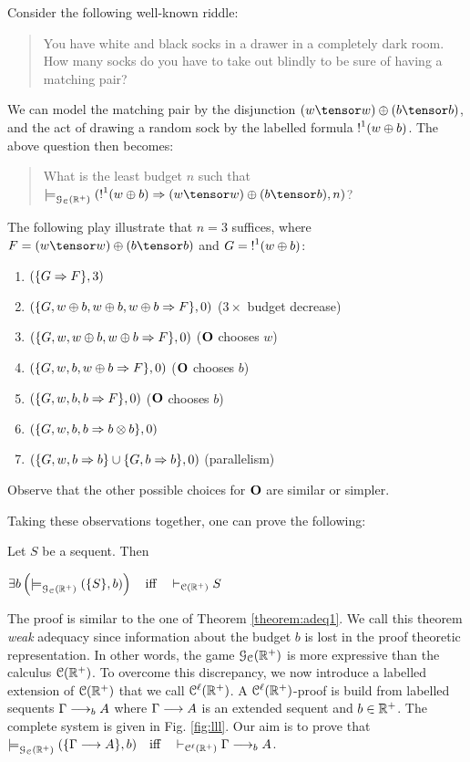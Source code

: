 \begin{example}\label{ex:riddle}
Consider the following well-known riddle:
\begin{quote}
You have white and black socks in a drawer in a completely dark room. How many socks do you have to take out blindly to be sure of having a matching pair? 
\end{quote}
We can model the matching pair by the disjunction $(w\tensor w)\oplus(b\tensor b)$, and the act of drawing a random sock by the labelled formula $\hbox{$\mathop{!}^{1}$}(w\oplus b)$. The above question then becomes:
\begin{quote}
What is the least budget $n$  such that $\wins{}{\GAIMALLR}(\nbang{1}(w\oplus b)\seq (w\tensor w)\oplus(b\tensor b),n)$?
\end{quote}
The following play illustrate that $n=3$ suffices, where $F=(w\tensor w)\oplus(b\tensor b)$ and $G=\hbox{$\mathop{!}^{1}$}(w\oplus b)$: \\
\begin{enumerate}
\item $(\{G\Rightarrow F\},3)$ 
\item $(\{G, w\oplus b, w\oplus b, w\oplus b\Rightarrow F\},0)$ ($3\times$ budget decrease)
\item $(\{G, w, w\oplus b, w\oplus b\Rightarrow F\},0)$ ($\mathbf{O}$ chooses $w$)
\item $(\{G, w, b, w\oplus b\Rightarrow F\},0)$ ($\mathbf{O}$ chooses $b$)
\item $(\{G, w, b, b\Rightarrow F\},0)$ ($\mathbf{O}$ chooses $b$)
\item $(\{G, w, b, b\Rightarrow b\otimes b\},0)$ 
\item $(\{G, w, b\Rightarrow b\}\cup \{G, b\Rightarrow b\},0)$ (parallelism)
\end{enumerate}
Observe that the other possible choices for $\mathbf{O}$ are similar or simpler. 
\end{example}


Taking these observations together, one can prove the following:

\begin{theorem}
\label{theorem:wadeq}
Let $S$ be a sequent. Then

$\exists b\left(\models^{}_{\mathcal{G}_{\mathcal{C}}(\mathbb{R}^+)}(\{S\},b)\right)\quad\mbox{iff}\quad\vdash_{\mathcal{C}(\mathbb{R}^+)} S$
\end{theorem}
The proof is similar to the one of Theorem \ref{theorem:adeq1}. We call this theorem \emph{weak} adequacy since information about the budget $b$ is lost in the proof theoretic representation. In other words, the game $\mathcal{G}_{\mathcal{C}}(\mathbb{R}^+)$ is more expressive than the calculus $\mathcal{C}(\mathbb{R}^+)$.
To overcome this discrepancy, we now introduce a  labelled extension of $\mathcal{C}(\mathbb{R}^+)$ that we call $\mathcal{C}^\ell(\mathbb{R}^+)$. A $\mathcal{C}^\ell(\mathbb{R}^+)$-proof is build from labelled sequents $\Gamma\longrightarrow_b A$ where $\Gamma\longrightarrow A$ is an extended sequent and $b\in\mathbb{R}^+$. The complete system is given in Fig. \ref{fig:lll}. 
Our aim is to prove that
$\models^{}_{\mathcal{G}_{\mathcal{C}}(\mathbb{R}^+)}(\{\Gamma\longrightarrow A\},b)\quad\mbox{iff}\quad\vdash_{\mathcal{C}^\ell(\mathbb{R}^+)} \Gamma\longrightarrow_b A$.
